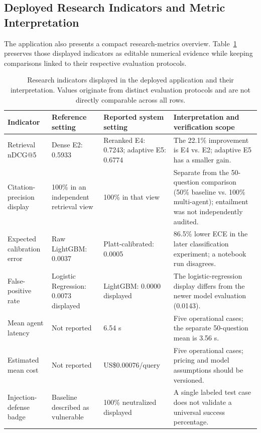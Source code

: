 \documentclass[journal,twoside]{IEEEtran}
\begin{document}
\subsection{Deployed Research Indicators and Metric Interpretation}
The application also presents a compact research-metrics overview. Table~\ref{tab:dashboard} preserves those displayed indicators as editable numerical evidence while keeping comparisons linked to their respective evaluation protocols.
\begin{table}[!t]
\caption{Research indicators displayed in the deployed application and their interpretation. Values originate from distinct evaluation protocols and are not directly comparable across all rows.}
\label{tab:dashboard}
\centering\scriptsize
\setlength{\tabcolsep}{4pt}
\renewcommand{\arraystretch}{1.09}
\begin{tabular}{p{}p{}p{}p{}}
\toprule
Indicator & Reference setting & Reported system setting & Interpretation and verification scope \\\midrule
Retrieval nDCG@5 & Dense E2: 0.5933 & Reranked E4: 0.7243; adaptive E5: 0.6774 & The 22.1\% improvement is E4 vs. E2; adaptive E5 has a smaller gain.\\
Citation-precision display & 100\% in an independent retrieval view & 100\% in that view & Separate from the 50-question comparison (50\% baseline vs. 100\% multi-agent); entailment was not independently audited.\\
Expected calibration error & Raw LightGBM: 0.0037 & Platt-calibrated: 0.0005 & 86.5\% lower ECE in the later classification experiment; a notebook run disagrees.\\
False-positive rate & Logistic Regression: 0.0073 displayed & LightGBM: 0.0000 displayed & The logistic-regression display differs from the newer model evaluation (0.0143).\\
Mean agent latency & Not reported & 6.54 s & Five operational cases; the separate 50-question mean is 3.56 s.\\
Estimated mean cost & Not reported & US\$0.00076/query & Five operational cases; pricing and model assumptions should be versioned.\\
Injection-defense badge & Baseline described as vulnerable & 100\% neutralized displayed & A single labeled test case does not validate a universal success percentage.\\
\bottomrule
\end{tabular}
\end{table}
\end{document}
